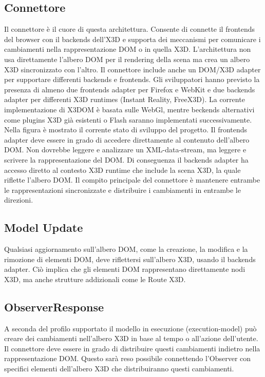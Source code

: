 \clearpage
\subsection{Connettore}
Il connettore è il cuore di questa architettura. Consente di connette il frontends del browser con il backends 
dell'X3D e supporta dei meccanismi per comunicare i cambiamenti nella rappresentazione DOM o in quella X3D. 
L'architettura non usa direttamente l'albero DOM per il rendering della scena ma crea un albero X3D sincronizzato con l'altro. 
Il connettore include anche un DOM/X3D adapter per supportare differenti backends e frontends. Gli sviluppatori hanno previsto 
la presenza di almeno due frontends adapter per Firefox e WebKit e due backends adapter per differenti X3D runtimes (Instant Reality, FreeX3D). 
La corrente implementazione di X3DOM è basata sulle WebGl, mentre beckends alternativi come plugins X3D già esistenti o Flash saranno implementati 
successivamente. Nella figura è mostrato il corrente stato di sviluppo del progetto. Il frontends adapter deve essere in grado 
di accedere direttamente al contenuto dell'albero DOM. Non dovrebbe leggere e analizzare un XML-data-stream, ma leggere e scrivere la 
rappresentazione del DOM. Di conseguenza il backends adapter ha accesso diretto al contesto X3D runtime che include la scena X3D, la quale 
riflette l'albero DOM. Il compito principale del connettore è mantenere entrambe le rappresentazioni sincronizzate e distribuire i 
cambiamenti in entrambe le direzioni.
 
\subsection{Model Update}
Qualsiasi aggiornamento sull'albero DOM, come la creazione, la modifica e la rimozione di elementi DOM, deve riflettersi sull'albero X3D, 
usando il backends adapter. Ciò implica che gli elementi DOM rappresentano direttamente nodi X3D, ma anche strutture addizionali 
come le Route X3D.

\subsection{ObserverResponse}
A seconda del profilo supportato il modello in esecuzione (execution-model) può creare dei cambiamenti nell'albero X3D 
in base al tempo o all'azione dell'utente. Il connettore deve essere in grado di distribuire questi cambiamenti indietro 
nella rappresentazione DOM. Questo sarà reso possibile connettendo l'Observer con specifici elementi dell'albero X3D che 
distribuiranno questi cambiamenti.

